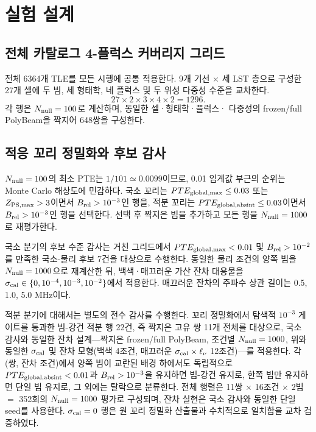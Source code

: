 \documentclass[final,5p,times]{elsarticle}
\newcommand{\NTLERecords}{6364}
\newcommand{\NCells}{27}
\newcommand{\NMainRows}{1296}
\newcommand{\NBeamPairs}{648}
\newcommand{\NNullMain}{100}
\newcommand{\NNullTail}{1000}
\newcommand{\NIntTailBeamRobustEthree}{22}
\newcommand{\NCandidateAudit}{7}
\newcommand{\NIntAuditPairs}{11}
\newcommand{\NIntAuditConds}{16}
\newcommand{\NIntAuditEvals}{352}
\begin{document}
\section{실험 설계}
\label{sec:design}

\subsection{전체 카탈로그 4-플럭스 커버리지 그리드}
\label{sec:design:grid}

전체 \NTLERecords{}개 TLE를 모든 시행에 공통 적용한다. 9개 기선
$\times$ 세 LST 층으로 구성한 \NCells{}개 셀에 두 빔, 세 형태학,
네 플럭스 및 두 위성 다중성 수준을 교차한다.
\begin{equation}
 27\times2\times3\times4\times2=\NMainRows{}.
\end{equation}
각 행은 $N_{\rm null}=\NNullMain$로 계산하며, 동일한 셀·형태학·플럭스·
다중성의 frozen/full PolyBeam을 짝지어 \NBeamPairs{}쌍을 구성한다.

\subsection{적응 꼬리 정밀화와 후보 감사}
\label{sec:design:tail}

$N_{\rm null}=100$의 최소 PTE는 $1/101\simeq0.0099$이므로, 0.01
임계값 부근의 순위는 Monte Carlo 해상도에 민감하다. 국소 꼬리는
$PTE_{\rm global,max}\le0.03$ 또는 $Z_{\rm PS,max}>3$이면서
$B_{\rm rel}>10^{-3}$인 행을, 적분 꼬리는
$PTE_{\rm global,absint}\le0.03$이면서 $B_{\rm rel}>10^{-3}$인
행을 선택한다. 선택 후 짝지은 빔을 추가하고 모든 행을
$N_{\rm null}=\NNullTail$로 재평가한다.

국소 분기의 후보 수준 감사는 거친 그리드에서
$PTE_{\rm global,max}<0.01$ 및 $B_{\rm rel}>10^{-2}$를 만족한
국소-물리 후보 \NCandidateAudit{}건을 대상으로 수행한다. 동일한
물리 조건의 양쪽 빔을 $N_{\rm null}=1000$으로 재계산한 뒤,
백색·매끄러운 가산 잔차 대용물을
$\sigma_{\rm cal}\in\{0,10^{-4},10^{-3},10^{-2}\}$에서 적용한다.
매끄러운 잔차의 주파수 상관 길이는 0.5, 1.0, 5.0 MHz이다.

적분 분기에 대해서는 별도의 전수 감사를 수행한다. 꼬리 정밀화에서
탐색적 $10^{-3}$ 게이트를 통과한 빔-강건 적분 행
\NIntTailBeamRobustEthree{}건, 즉 짝지은 고유 쌍
\NIntAuditPairs{}개 전체를 대상으로, 국소 감사와 동일한 잔차
설계---짝지은 frozen/full PolyBeam, 조건별
$N_{\rm null}=\NNullTail$, 위와 동일한 $\sigma_{\rm cal}$ 및 잔차
모형(백색 4조건, 매끄러운 $\sigma_{\rm cal}\times\ell_\nu$
12조건)---를 적용한다. 각 (쌍, 잔차 조건)에서 양쪽 빔이 교란된
배경 하에서도 독립적으로 $PTE_{\rm global,absint}<0.01$과
$B_{\rm rel}>10^{-3}$을 유지하면 빔-강건 유지로, 한쪽 빔만
유지하면 단일 빔 유지로, 그 외에는 탈락으로 분류한다. 전체 행렬은
\NIntAuditPairs{}쌍 $\times$ \NIntAuditConds{}조건 $\times$ 2빔
$=$ \NIntAuditEvals{}회의 $N_{\rm null}=\NNullTail$ 평가로
구성되며, 잔차 실현은 국소 감사와 동일한 단일 seed를 사용한다.
$\sigma_{\rm cal}=0$ 행은 원 꼬리 정밀화 산출물과 수치적으로
일치함을 교차 검증하였다.
\end{document}
